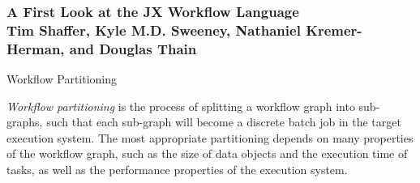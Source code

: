 \documentclass{beamer}
\newcommand{\jx}{JX\xspace}
\newcommand{\extrafun}{JSON~eXtended\xspace}
\newcommand{\lm}{Lifemapper\xspace}
\newcommand{\condor}{ND-Condor\xspace}
\newcommand{\jetstream}{IU-Jetstream\xspace}
\newcommand{\comet}{SDSC-Comet\xspace}
\begin{document}
\begin{frame}[fragile]
\frametitle{
  {\fontsize{64pt}{64pt}\selectfont
  \textbf{A First Look at the JX Workflow Language}} \\ \vspace{32pt}
  {\fontsize{48pt}{48pt}\selectfont
  Tim Shaffer, Kyle M.D. Sweeney, Nathaniel Kremer-Herman, and Douglas Thain}
}

\vspace*{64pt}

\begin{minipage}[t][0.97\textheight]{0.65\textwidth}
\begin{minipage}[t][0.86\textheight]{0.48\textwidth}


\begin{alertblock}{Workflow Partitioning\rule{0pt}{2.1ex}}
\vspace*{16pt}
\parbox{\linewidth}{\emph{Workflow partitioning} is the process of splitting a workflow graph into sub-graphs,
such that each sub-graph will become a discrete
batch job in the target execution system.
The most appropriate partitioning depends on
many properties of the workflow graph,
such as the size of data objects and the execution
time of tasks, as well as the performance properties
of the execution system.}

\vspace*{32pt}


\end{alertblock}
\end{minipage}
\end{minipage}
\end{frame}
\end{document}

